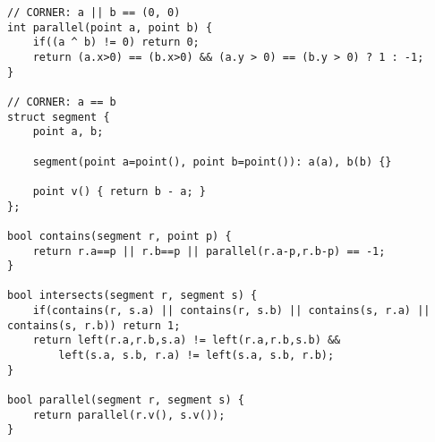 \documentclass{article}
\begin{document}
\begin{verbatim}
// CORNER: a || b == (0, 0)
int parallel(point a, point b) {
	if((a ^ b) != 0) return 0;
	return (a.x>0) == (b.x>0) && (a.y > 0) == (b.y > 0) ? 1 : -1;
}

// CORNER: a == b
struct segment {
	point a, b;

	segment(point a=point(), point b=point()): a(a), b(b) {}

	point v() { return b - a; }
};

bool contains(segment r, point p) {
	return r.a==p || r.b==p || parallel(r.a-p,r.b-p) == -1;
}

bool intersects(segment r, segment s) {
	if(contains(r, s.a) || contains(r, s.b) || contains(s, r.a) || contains(s, r.b)) return 1;
	return left(r.a,r.b,s.a) != left(r.a,r.b,s.b) && 
		left(s.a, s.b, r.a) != left(s.a, s.b, r.b);
}

bool parallel(segment r, segment s) {
	return parallel(r.v(), s.v());
}
\end{verbatim}
\end{document}
